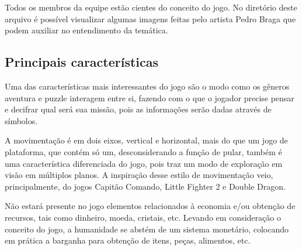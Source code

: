 \documentclass[12pt]{article}
\begin{document}
Todos os membros da equipe estão cientes do conceito do jogo. No diretório
deste arquivo é possível visualizar algumas imagens feitas pelo artista Pedro
Braga que podem auxiliar no entendimento da temática.

\subsection{Principais características}
Uma das características mais interessantes do jogo são o modo como os gêneros
aventura e puzzle interagem entre si, fazendo com o que o jogador precise
pensar e decifrar qual será sua missão, pois as informações serão dadas
através de símbolos.

A movimentação é em dois eixos, vertical e horizontal, mais do que um jogo de
plataforma, que contém só um, desconsiderando a função de pular, também é uma
característica diferenciada do jogo, pois traz um modo de exploração em visão
em múltiplos planos. A inspiração desse estilo de movimentação veio,
principalmente, do jogos Capitão Comando, Little Fighter 2 e Double Dragon.

Não estará presente no jogo elementos relacionados à economia e/ou obtenção de
recursos, tais como dinheiro, moeda, cristais, etc. Levando em consideração o
conceito do jogo, a humanidade se abstém de um sistema monetário, colocando em
prática a barganha para obtenção de itens, peças, alimentos, etc.
\end{document}
